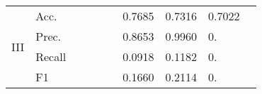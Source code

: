 \begin{tabular}{clllllllll}
    \midrule
    \multirow{4}{*}{III}                                                                          & Acc.                                             &                         &                         &                              &                         & 0.7685                             & 0.7316                            & 0.7022                                    &                                           \\
                                                                                                    & Prec.                                            &                         &                         &                              &                         & 0.8653                             & 0.9960                            & 0.                                        &                                           \\
                                                                                                    & Recall                                               &                         &                         &                              &                         & 0.0918                             & 0.1182                            & 0.                                        &                                           \\
                                                                                                    & F1                                                   &                         &                         &                              &                         & 0.1660                             & 0.2114                            & 0.                                        &                                           \\
    \bottomrule
\end{tabular}

